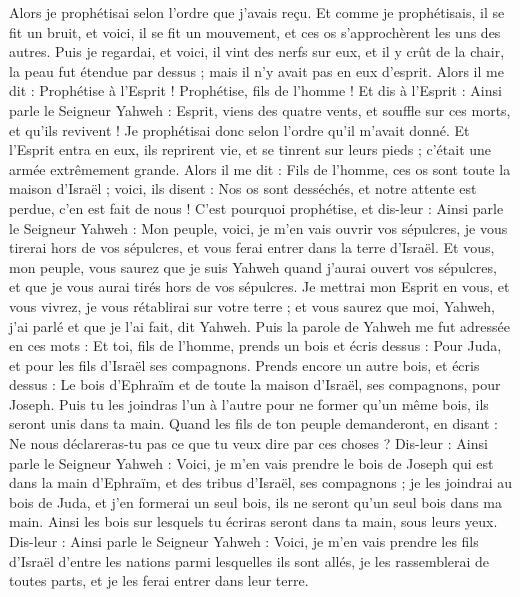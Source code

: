 \begin{multicols}{2}
Alors je prophétisai selon l’ordre que j’avais reçu. Et comme je prophétisais, il se fit un bruit, et voici, il se fit un mouvement, et ces os s'approchèrent les uns des autres.
Puis je regardai, et voici, il vint des nerfs sur eux, et il y crût de la chair, la peau fut étendue par dessus ; mais il n’y avait pas en eux d’esprit.
Alors il me dit : Prophétise à l'Esprit ! Prophétise, fils de l’homme ! Et dis à l'Esprit : Ainsi parle le Seigneur Yahweh : Esprit, viens des quatre vents, et souffle sur ces morts, et qu'ils revivent !
Je prophétisai donc selon l’ordre qu’il m'avait donné. Et l'Esprit entra en eux, ils reprirent vie, et se tinrent sur leurs pieds ; c’était une armée extrêmement grande.
Alors il me dit : Fils de l’homme, ces os sont toute la maison d'Israël ; voici, ils disent : Nos os sont desséchés, et notre attente est perdue, c'en est fait de nous !
C'est pourquoi prophétise, et dis-leur : Ainsi parle le Seigneur Yahweh : Mon peuple, voici, je m'en vais ouvrir vos sépulcres, je vous tirerai hors de vos sépulcres, et vous ferai entrer dans la terre d'Israël.
Et vous, mon peuple, vous saurez que je suis Yahweh quand j'aurai ouvert vos sépulcres, et que je vous aurai tirés hors de vos sépulcres.
Je mettrai mon Esprit en vous, et vous vivrez, je vous rétablirai sur votre terre ; et vous saurez que moi, Yahweh, j'ai parlé et que je l'ai fait, dit Yahweh.
Puis la parole de Yahweh me fut adressée en ces mots :
Et toi, fils de l’homme, prends un bois et écris dessus : Pour Juda, et pour les fils d'Israël ses compagnons. Prends encore un autre bois, et écris dessus : Le bois d'Ephraïm et de toute la maison d'Israël, ses compagnons, pour Joseph.
Puis tu les joindras l'un à l'autre pour ne former qu'un même bois, ils seront unis dans ta main.
Quand les fils de ton peuple demanderont, en disant : Ne nous déclareras-tu pas ce que tu veux dire par ces choses ?
Dis-leur : Ainsi parle le Seigneur Yahweh : Voici, je m'en vais prendre le bois de Joseph qui est dans la main d'Ephraïm, et des tribus d'Israël, ses compagnons ; je les joindrai au bois de Juda, et j’en formerai un seul bois, ils ne seront qu'un seul bois dans ma main.
Ainsi les bois sur lesquels tu écriras seront dans ta main, sous leurs yeux.
Dis-leur : Ainsi parle le Seigneur Yahweh : Voici, je m'en vais prendre les fils d'Israël d'entre les nations parmi lesquelles ils sont allés, je les rassemblerai de toutes parts, et je les ferai entrer dans leur terre.

\end{multicols}
